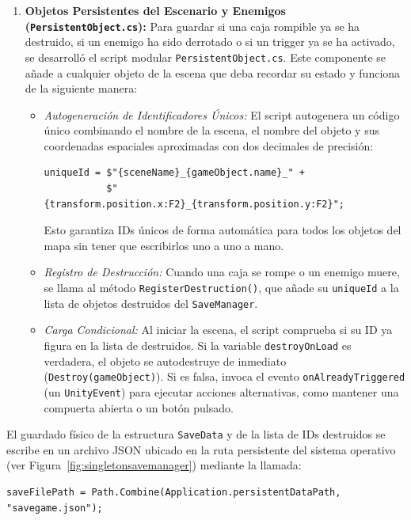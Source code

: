 \begin{enumerate}
    \item \textbf{Objetos Persistentes del Escenario y Enemigos (\texttt{PersistentObject.cs}):}
    Para guardar si una caja rompible ya se ha destruido, si un enemigo ha sido derrotado o si un trigger ya se ha activado, se desarrolló el script modular \texttt{PersistentObject.cs}. Este componente se añade a cualquier objeto de la escena que deba recordar su estado y funciona de la siguiente manera:
    \begin{itemize}
        \item \textit{Autogeneración de Identificadores Únicos:} El script autogenera un código único combinando el nombre de la escena, el nombre del objeto y sus coordenadas espaciales aproximadas con dos decimales de precisión:
\begin{verbatim}
uniqueId = $"{sceneName}_{gameObject.name}_" +
           $"{transform.position.x:F2}_{transform.position.y:F2}";
\end{verbatim}
        Esto garantiza IDs únicos de forma automática para todos los objetos del mapa sin tener que escribirlos uno a uno a mano.
        \item \textit{Registro de Destrucción:} Cuando una caja se rompe o un enemigo muere, se llama al método \texttt{RegisterDestruction()}, que añade su \texttt{uniqueId} a la lista de objetos destruidos del \texttt{SaveManager}.
        \item \textit{Carga Condicional:} Al iniciar la escena, el script comprueba si su ID ya figura en la lista de destruidos. Si la variable \texttt{destroyOnLoad} es verdadera, el objeto se autodestruye de inmediato (\texttt{Destroy(gameObject)}). Si es falsa, invoca el evento \texttt{onAlreadyTriggered} (un \texttt{UnityEvent}) para ejecutar acciones alternativas, como mantener una compuerta abierta o un botón pulsado.
    \end{itemize}
\end{enumerate}

El guardado físico de la estructura \texttt{SaveData} y de la lista de IDs destruidos se escribe en un archivo JSON ubicado en la ruta persistente del sistema operativo (ver Figura~\ref{fig:singletonsavemanager}) mediante la llamada:
\begin{verbatim}
saveFilePath = Path.Combine(Application.persistentDataPath, "savegame.json");
\end{verbatim}

